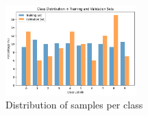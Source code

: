 \documentclass[a4paper,12pt]{article}
\begin{document}
\begin{figure}[H]
	\centering
		\includegraphics[width=0.45\textwidth]{final_results_class_distr.png}
		\caption{Distribution of samples per class}
		\label{fig:class_distr}
\end{figure}

\end{document}
